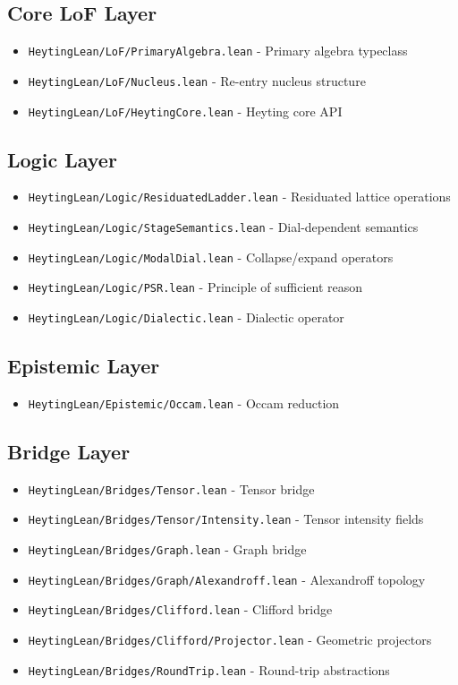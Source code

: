\documentclass{amsart}
\theoremstyle{definition}
\theoremstyle{remark}
\begin{document}
\subsection{Core LoF Layer}
\begin{itemize}
\item \texttt{HeytingLean/LoF/PrimaryAlgebra.lean} - Primary algebra typeclass
\item \texttt{HeytingLean/LoF/Nucleus.lean} - Re-entry nucleus structure
\item \texttt{HeytingLean/LoF/HeytingCore.lean} - Heyting core API
\end{itemize}

\subsection{Logic Layer}
\begin{itemize}
\item \texttt{HeytingLean/Logic/ResiduatedLadder.lean} - Residuated lattice operations
\item \texttt{HeytingLean/Logic/StageSemantics.lean} - Dial-dependent semantics
\item \texttt{HeytingLean/Logic/ModalDial.lean} - Collapse/expand operators
\item \texttt{HeytingLean/Logic/PSR.lean} - Principle of sufficient reason
\item \texttt{HeytingLean/Logic/Dialectic.lean} - Dialectic operator
\end{itemize}

\subsection{Epistemic Layer}
\begin{itemize}
\item \texttt{HeytingLean/Epistemic/Occam.lean} - Occam reduction
\end{itemize}

\subsection{Bridge Layer}
\begin{itemize}
\item \texttt{HeytingLean/Bridges/Tensor.lean} - Tensor bridge
\item \texttt{HeytingLean/Bridges/Tensor/Intensity.lean} - Tensor intensity fields
\item \texttt{HeytingLean/Bridges/Graph.lean} - Graph bridge
\item \texttt{HeytingLean/Bridges/Graph/Alexandroff.lean} - Alexandroff topology
\item \texttt{HeytingLean/Bridges/Clifford.lean} - Clifford bridge
\item \texttt{HeytingLean/Bridges/Clifford/Projector.lean} - Geometric projectors
\item \texttt{HeytingLean/Bridges/RoundTrip.lean} - Round-trip abstractions
\end{itemize}
\end{document}

